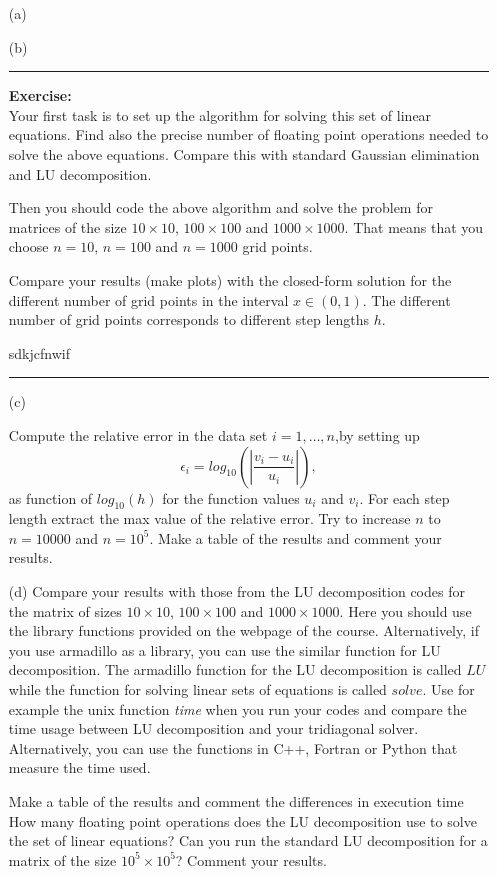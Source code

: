 \documentclass[11pt,a4wide]{article}
\begin{document}
\begin{enumerate}
\item[(a)] 


\item[(b)]



\rule{\textwidth}{1pt}
\textbf{Exercise:}\\
Your first task is to set up the algorithm for solving this set of linear equations.
Find also the precise number of floating point 
operations needed to solve the above equations. 
Compare this with standard Gaussian elimination and LU decomposition.

Then you should code the above algorithm and solve the problem for matrices of the size
$10\times 10$, $100\times 100$ and $1000\times 1000$.  That means that you choose $n=10$, $n=100$ and
$n=1000$ grid points. 

Compare your results (make plots) with the closed-form solution for the different number of grid points  in the 
interval $x\in(0,1)$.  The different number of grid points corresponds to different step lengths $h$.

sdkjcfnwif
\rule{\textwidth}{1pt}
\item[(c)]

Compute the relative error  in the data set $i=1,\dots, n$,by setting up 
\[
   \epsilon_i=log_{10}\left(\left|\frac{v_i-u_i}
                 {u_i}\right|\right),
\]
as function of $log_{10}(h)$ for the function values $u_i$ and $v_i$.
For each step length extract the max value of the relative error.  
Try to increase $n$ to $n=10000$ and $n=10^5$.  Make a table of the results and 
comment your results. 

\item[(d)]
Compare your results with those from the LU decomposition codes for the matrix of sizes $10\times 10$, $100\times 100$ and
$1000\times 1000$. Here you should use the library functions provided  on the webpage of the course. Alternatively, if you use armadillo as a library, you can use the similar function for LU decomposition.  The armadillo function for the LU decomposition is called $LU$ while the function for solving linear sets of equations is called $solve$.
Use for example the unix function {\em time} when you run your codes 
and compare the time usage between LU decomposition and  your
tridiagonal solver.   Alternatively, you can use the functions in C++, Fortran or Python that measure the time used. 

Make a table of the results and comment the differences
in execution time
How many floating point operations does the LU decomposition use to solve the set of linear equations?
Can you run the standard LU decomposition
for a matrix of the size $10^5\times 10^5$?
Comment your results.



\end{enumerate}
\end{document}
